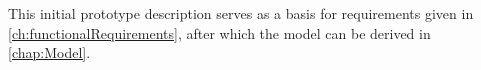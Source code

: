 





This initial prototype description serves as a basis for requirements given in \autoref{ch:functionalRequirements}, after which the model can be derived in \autoref{chap:Model}.


